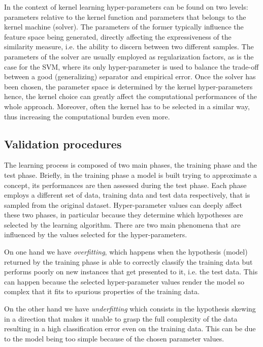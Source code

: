 In the context of kernel learning hyper-parameters can be found on two levels:
parameters relative to the kernel function and parameters that belongs to the
kernel machine (solver).
The parameters of the former typically influence the feature space being generated,
directly affecting the expressiveness of the similarity measure, i.e. the ability
to discern between two different samples.
The parameters of the solver are usually employed as regularization factors,
as is the case for the SVM, where its only hyper-parameter is used to balance the trade-off between a good
(generalizing) separator and empirical error.
Once the solver has been chosen, the parameter space is determined by the kernel
hyper-parameters hence, the kernel choice can greatly affect the computational
performances of the whole approach.
Moreover, often the kernel has to be selected in a similar way, thus increasing the
computational burden even more.

\subsection{Validation procedures}
The learning process is composed of two main phases, the training phase and
the test phase.
Briefly, in the training phase a model is built trying to approximate a concept, its performances
are then assessed during the test phase.
Each phase employs a different set of data, training data and test data respectively,
that is sampled from the original dataset.
Hyper-parameter values can deeply affect these two phases, in particular
because they determine which hypotheses are selected by the learning algorithm.
There are two main phenomena that are influenced by the values selected for the
hyper-parameters.

On one hand we have \emph{overfitting}, which happens when the hypothesis
(model) returned by the training phase is able to correctly classify the training data
but performs poorly on new instances that get presented to it, i.e. the test data.
This can happen because the selected hyper-parameter values render the model so
complex that it fits to spurious properties of the training data.

On the other hand we have \emph{underfitting} which consists in the hypothesis skewing
in a direction that makes it unable to grasp the full complexity of the data resulting
in a high classification error even on the training data.
This can be due to the model being too simple because of the chosen parameter values. 

